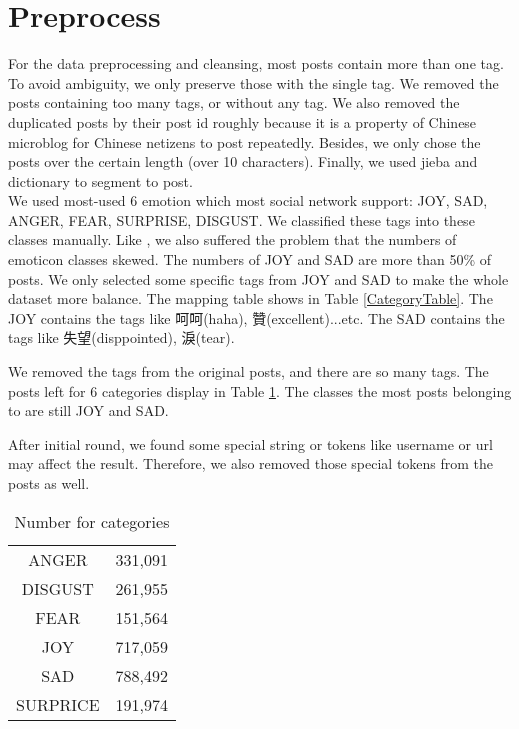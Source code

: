 \section{Preprocess}

For the data preprocessing and cleansing, most posts contain more than one tag. To avoid ambiguity, we only preserve those with the single tag.
We removed the posts containing too many tags, or without any tag. We also removed the duplicated posts by their post id roughly because it is a property of Chinese microblog \cite{fu2013reality} for Chinese netizens to post repeatedly. 
Besides, we only chose the posts over the certain length (over 10 characters). Finally, we used jieba and dictionary to segment to post. \\

We used most-used 6 emotion which most social network support: JOY, SAD, ANGER, FEAR, SURPRISE, DISGUST.
We classified these tags into these classes manually. 
Like \cite{zhao2012moodlens}, we also suffered the problem that the numbers of emoticon classes skewed. The numbers of JOY and SAD are more than 50\% of posts. 
We only selected some specific tags from JOY and SAD to make the whole dataset more balance.   
The mapping table shows in Table \ref{CategoryTable}. The JOY contains the tags like 呵呵(haha), 贊(excellent)...etc. 
The SAD contains the tags like 失望(disppointed), 淚(tear).


We removed the tags from the original posts, and there are so many tags. 
The posts left for 6 categories display in Table \ref{cat_num}. 
The classes the most posts belonging to are still JOY and SAD. 

After initial round, we found some special string or tokens like username or url may affect the result. 
Therefore, we also removed those special tokens from the posts as well.

\begin{table}[]
\centering
\caption{Number for categories}
\label{cat_num}
\begin{tabular}{|c|c|}
\hline
ANGER      &331,091 \\                                                           
DISGUST    &261,955 \\                                                         
FEAR       &151,564 \\                                                         
JOY        &717,059 \\                                                           
SAD        &788,492 \\                                                           
SURPRICE   &191,974 \\
\hline
\end{tabular}
\end{table}


